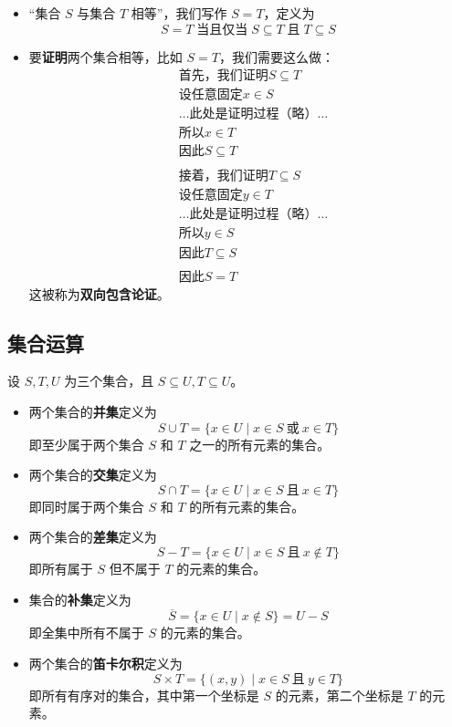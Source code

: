 \begin{itemize}
    \item ``集合 $S$ 与集合 $T$ 相等''，我们写作 $S=T$，定义为
        \[S = T \;\text{当且仅当}\; S \subseteq T \;\text{且}\; T \subseteq S\]
    \item 要\textbf{证明}两个集合相等，比如 $S=T$，我们需要这么做：
        \begin{align*}
            &\text{首先，我们证明}S \subseteq T\\
            &\text{设任意固定} x \in S \\
            &\dots \text{此处是证明过程（略）}\dots\\
            &\text{所以}x \in T\\
            &\text{因此}S \subseteq T\\
            \\
            &\text{接着，我们证明}T \subseteq S\\
            &\text{设任意固定} y \in T \\
            &\dots \text{此处是证明过程（略）}\dots\\
            &\text{所以}y \in S\\
            &\text{因此}T \subseteq S\\
            \\
            &\text{因此}S = T
        \end{align*}
        这被称为\textbf{双向包含论证}。
\end{itemize}

\subsection{集合运算}

设 $S,T,U$ 为三个集合，且 $S \subseteq U, T \subseteq U$。

\begin{itemize}
    \item 两个集合的\textbf{并集}定义为
        \[ S \cup T = \{x \in U \mid x \in S \:\text{或}\: x \in T\}\]
        即至少属于两个集合 $S$ 和 $T$ 之一的所有元素的集合。
    \item 两个集合的\textbf{交集}定义为
        \[S \cap T = \{x \in U \mid x \in S \:\text{且}\: x \in T\}\]
        即同时属于两个集合 $S$ 和 $T$ 的所有元素的集合。
    \item 两个集合的\textbf{差集}定义为
        \[S - T = \{x \in U \mid x \in S \:\text{且}\: x \notin T\}\]
        即所有属于 $S$ 但不属于 $T$ 的元素的集合。
    \item 集合的\textbf{补集}定义为
        \[\overline{S} = \{x\in U \mid x \notin S\}=U-S\]
        即全集中所有不属于 $S$ 的元素的集合。
    \item 两个集合的\textbf{笛卡尔积}定义为
        \[S \times T = \{(x,y) \mid x \in S \:\text{且}\: y \in T\}\]
        即所有有序对的集合，其中第一个坐标是 $S$ 的元素，第二个坐标是 $T$ 的元素。
\end{itemize}

